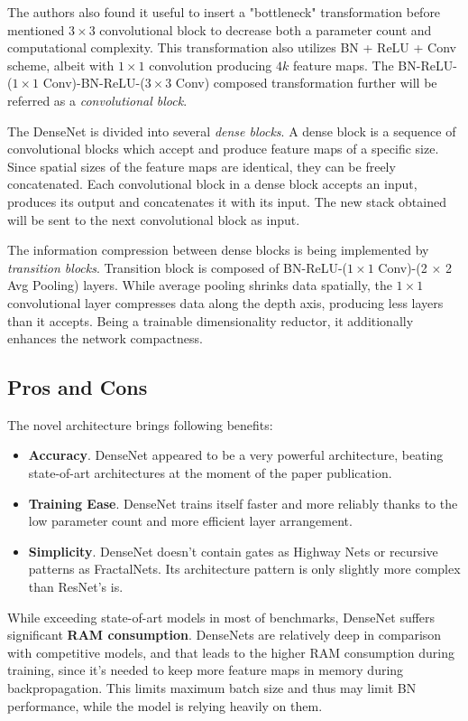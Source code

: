 \documentclass[thesis=B,english]{FITthesis}[2019/12/23]
\begin{document}
The authors also found it useful to insert a "bottleneck" transformation before mentioned $3 \times 3$ convolutional block to decrease both a parameter count and computational complexity. This transformation also utilizes BN + ReLU + Conv scheme, albeit with $1 \times 1$ convolution producing $4k$ feature maps. The BN-ReLU-($1 \times 1$ Conv)-BN-ReLU-($3 \times 3$ Conv) composed transformation further will be referred as a \textit{convolutional block}.

The DenseNet is divided into several \textit{dense blocks}. A dense block is a sequence of convolutional blocks which accept and produce feature maps of a specific size. Since spatial sizes of the feature maps are identical, they can be freely concatenated. Each convolutional block in a dense block accepts an input, produces its output and concatenates it with its input. The new stack obtained will be sent to the next convolutional block as input.

The information compression between dense blocks is being implemented by \textit{transition blocks}. Transition block is composed of BN-ReLU-($1 \times 1$ Conv)-(2 $\times$ 2 Avg Pooling) layers. While average pooling shrinks data spatially, the $1 \times 1$ convolutional layer compresses data along the depth axis, producing less layers than it accepts. Being a trainable dimensionality reductor, it additionally enhances the network compactness.

\subsection{Pros and Cons}

The novel architecture brings following benefits:

\begin{itemize}
	\item \textbf{Accuracy}. DenseNet appeared to be a very powerful architecture, beating\cite{densenet} state-of-art architectures at the moment of the paper publication.
	\item \textbf{Training Ease}. DenseNet trains itself faster and more reliably thanks to the low parameter count and more efficient layer arrangement.
	\item \textbf{Simplicity}. DenseNet doesn't contain gates as Highway Nets or recursive patterns as FractalNets. Its architecture pattern is only slightly more complex than ResNet's is.
\end{itemize}

While exceeding state-of-art models in most of benchmarks, DenseNet suffers significant \textbf{RAM consumption}. DenseNets are relatively deep in comparison with competitive models, and that leads to the higher RAM consumption during training, since it's needed to keep more feature maps in memory during backpropagation. This limits maximum batch size and thus may limit BN performance, while the model is relying heavily on them.
\end{document}
